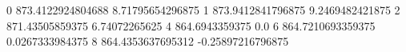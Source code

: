 0 873.4122924804688 8.71795654296875
1 873.9412841796875 9.2469482421875
2 871.43505859375 6.74072265625
4 864.6943359375 0.0
6 864.7210693359375 0.0267333984375
8 864.4353637695312 -0.25897216796875
